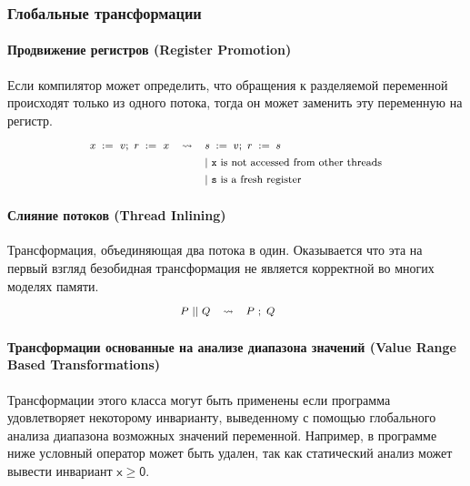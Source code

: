 \subsubsection{Глобальные трансформации}

\paragraph{
Продвижение регистров
(Register Promotion)
}

Если компилятор может определить, что 
обращения к разделяемой переменной 
происходят только из одного потока,
тогда он может заменить эту переменную на регистр.
%
\[\def\arraystretch{1.4}\footnotesize
  \begin{array}{ccl} 

      \writeInst{}{x}{v} \seq \readInst{}{r}{x} 
    & \leadsto 
    & \assignInst{s}{v} \seq \assignInst{r}{s}
    \\ 
    
    & & |~ \text{\texttt{x} is not accessed from other threads} \\
    & & |~ \text{\texttt{s} is a fresh register} \\ 

  \end{array}
\]

\paragraph{Слияние потоков (Thread Inlining)}

Трансформация, объединяющая два потока в один.
Оказывается что эта на первый взгляд безобидная
трансформация не является корректной во многих моделях памяти. 
%
\[\def\arraystretch{1.4}\footnotesize
  \begin{array}{cccl} 

      P \pll Q 
    & \leadsto 
    & P ~\seq Q
    & ~ \\ 
    
  \end{array}
\]


\paragraph{
Трансформации основанные на анализе диапазона значений
(Value Range Based Transformations)
}

Трансформации этого класса могут быть применены
если программа удовлетворяет некоторому инварианту,
выведенному с помощью глобального анализа 
диапазона возможных значений переменной.
Например, в программе ниже условный оператор
может быть удален, так как статический 
анализ может вывести инвариант 
$\mathsf{x} \geq \mathsf{0}$.

